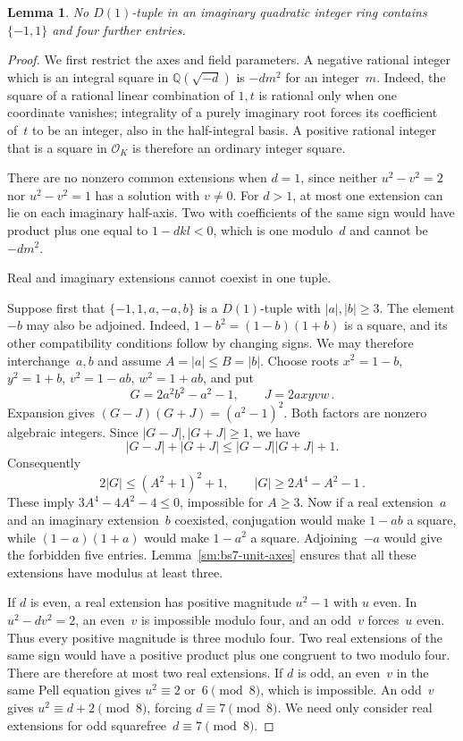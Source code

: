 \documentclass[12pt]{article}
\newtheorem{lemma}[theorem]{Lemma}
\newcommand{\OK}{\mathcal O_K}
\numberwithin{equation}{section}
\begin{document}
\begin{lemma}\label{sm:bs7-unit-pair}
No $D(1)$-tuple in an imaginary quadratic integer ring contains $\{-1,1\}$ and four further entries.
\end{lemma}
\begin{proof}
We first restrict the axes and field parameters. A negative rational integer which is an integral square in $\mathbb Q(\sqrt{-d})$ is $-dm^2$ for an integer~$m$. Indeed, the square of a rational linear combination of $1,t$ is rational only when one coordinate vanishes; integrality of a purely imaginary root forces its coefficient of~$t$ to be an integer, also in the half-integral basis. A positive rational integer that is a square in $\OK$ is therefore an ordinary integer square.

There are no nonzero common extensions when $d=1$, since neither $u^2-v^2=2$ nor $u^2-v^2=1$ has a solution with $v\ne0$. For $d>1$, at most one extension can lie on each imaginary half-axis. Two with coefficients of the same sign would have product plus one equal to $1-dkl<0$, which is one modulo~$d$ and cannot be $-dm^2$.

Real and imaginary extensions cannot coexist in one tuple.

Suppose first that $\{-1,1,a,-a,b\}$ is a $D(1)$-tuple with $|a|,|b|\ge3$. The element $-b$ may also be adjoined. Indeed, $1-b^2=(1-b)(1+b)$ is a square, and its other compatibility conditions follow by changing signs. We may therefore interchange~$a,b$ and assume $A=|a|\le B=|b|$. Choose roots $x^2=1-b$, $y^2=1+b$, $v^2=1-ab$, $w^2=1+ab$, and put
\begin{equation*}
 G=2a^2b^2-a^2-1,\qquad J=2axyvw\,.
\end{equation*}
Expansion gives $(G-J)(G+J)=(a^2-1)^2$. Both factors are nonzero algebraic integers. Since $|G-J|,|G+J|\ge1$, we have
\[
 |G-J|+|G+J|\le|G-J||G+J|+1.
\] Consequently
\begin{equation*}
 2|G|\le(A^2+1)^2+1,\qquad |G|\ge2A^4-A^2-1\,.
\end{equation*}
These imply $3A^4-4A^2-4\le0$, impossible for $A\ge3$. Now if a real extension~$a$ and an imaginary extension~$b$ coexisted, conjugation would make $1-ab$ a square, while $(1-a)(1+a)$ would make $1-a^2$ a square. Adjoining~$-a$ would give the forbidden five entries. Lemma~\ref{sm:bs7-unit-axes} ensures that all these extensions have modulus at least three.

If $d$ is even, a real extension has positive magnitude $u^2-1$ with $u$ even. In $u^2-dv^2=2$, an even~$v$ is impossible modulo four, and an odd~$v$ forces~$u$ even. Thus every positive magnitude is three modulo four. Two real extensions of the same sign would have a positive product plus one congruent to two modulo four. There are therefore at most two real extensions. If $d$ is odd, an even~$v$ in the same Pell equation gives $u^2\equiv2$ or~$6\pmod8$, which is impossible. An odd~$v$ gives $u^2\equiv d+2\pmod8$, forcing $d\equiv7\pmod8$. We need only consider real extensions for odd squarefree~$d\equiv7\pmod8$.


\end{proof}
\end{document}
